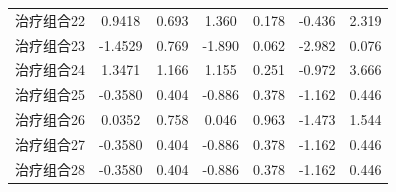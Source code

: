 \documentclass[bwprint]{gmcmthesis}
\begin{document}
\begin{table}[ht]
\begin{tabular}{lcccccc}
治疗组合22 & 0.9418 & 0.693 & 1.360 & 0.178 & -0.436 & 2.319 \\
治疗组合23 & -1.4529 & 0.769 & -1.890 & 0.062 & -2.982 & 0.076 \\
治疗组合24 & 1.3471 & 1.166 & 1.155 & 0.251 & -0.972 & 3.666 \\
治疗组合25 & -0.3580 & 0.404 & -0.886 & 0.378 & -1.162 & 0.446 \\
治疗组合26 & 0.0352 & 0.758 & 0.046 & 0.963 & -1.473 & 1.544 \\
治疗组合27 & -0.3580 & 0.404 & -0.886 & 0.378 & -1.162 & 0.446 \\
治疗组合28 & -0.3580 & 0.404 & -0.886 & 0.378 & -1.162 & 0.446 \\
\bottomrule
\end{tabular}
\end{table}
\end{document}

